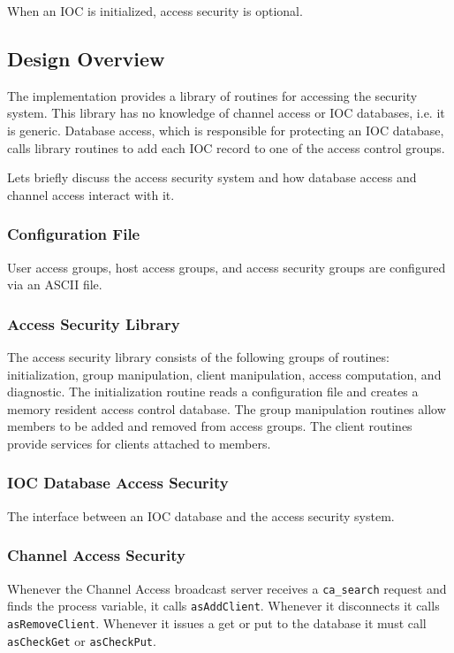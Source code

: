 When an IOC is initialized, access security is optional.

\subsection{Design Overview}

The implementation provides a library of routines for accessing the security system. This library has no knowledge of 
channel access or IOC databases, i.e. it is generic. Database access, which is responsible for protecting an IOC database, 
calls library routines to add each IOC record to one of the access control groups.

Lets briefly discuss the access security system and how database access and channel access interact with it.

\subsubsection{Configuration File}

User access groups, host access groups, and access security groups are configured via an ASCII file.

\subsubsection{Access Security Library}

The access security library consists of the following groups of routines: initialization, group manipulation, client 
manipulation, access computation, and diagnostic. The initialization routine reads a configuration file and creates a 
memory resident access control database. The group manipulation routines allow members to be added and removed from 
access groups. The client routines provide services for clients attached to members.

\subsubsection{IOC Database Access Security}

The interface between an IOC database and the access security system.

\subsubsection{Channel Access Security}

Whenever the Channel Access broadcast server receives a \verb|ca_search| request and finds the process variable, it calls 
\verb|asAddClient|.  Whenever it disconnects it calls \verb|asRemoveClient|. Whenever it issues a get or put to the database it 
must call \verb|asCheckGet| or \verb|asCheckPut|.

